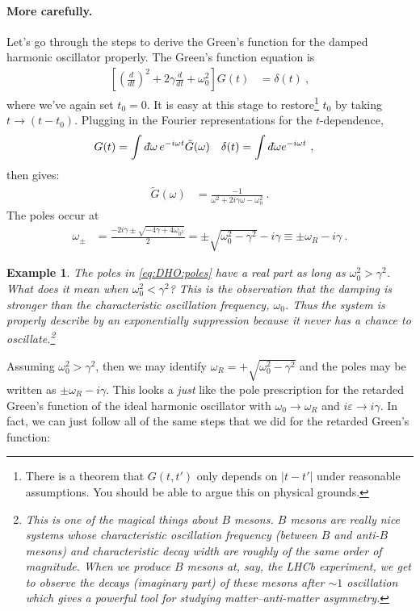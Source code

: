 \documentclass[
  11pt,
	colorful,
	raggedright,
]{tufte-style-thesis-flip}
\newtheorem{example}{Example}[section]
\renewcommand{\dbar}{d\hspace*{-0.08em}\bar{}\hspace*{0.1em}}
\begin{document}
 \paragraph{More carefully.} Let's go through the steps to derive the Green's function for the damped harmonic oscillator properly. The Green's function equation is
 \begin{align}
  \left[
  \left(\frac{d}{dt}\right)^2
  + 2\gamma \frac{d}{dt}
  + \omega_0^2
  \right]
  G(t)
  &=
  \delta(t) \ ,
 \end{align}
 where we've again set $t_0 = 0$. It is easy at this stage to restore\footnote{There is a theorem that $G(t,t')$ only depends on $|t-t'|$ under reasonable assumptions. You should be able to argue this on physical grounds.} $t_0$ by taking $t\to (t-t_0)$. Plugging in the Fourier representations for the $t$-dependence,
 \begin{align}
  G(t) &= \int \dbar \omega \, e^{-i\omega t}\tilde G(\omega)
  &
  \delta(t) &= \int \dbar \omega e^{-i\omega t} \ ,
 \end{align}
 then gives:
 \begin{align}
  \tilde G(\omega) &=
  \frac{-1}{\omega^2+2i\gamma\omega -\omega_0^2} \ .
 \end{align}
 The poles occur at 
 \begin{align}
  \omega_\pm &= \frac{-2i\gamma \pm \sqrt{-4\gamma + 4\omega_{0^2}}}{2}
  = \pm \sqrt{\omega_0^2 - \gamma^2} - i \gamma \equiv \pm \omega_R - i\gamma\ .
  \label{eq:DHO:poles}
 \end{align}
 \begin{example}
 The poles in \eqref{eq:DHO:poles} have a real part as long as $\omega_0^2 > \gamma^2$. What does it mean when $\omega_0^2 < \gamma^2$? This is the observation that the damping is stronger than the characteristic oscillation frequency, $\omega_0$. Thus the system is properly describe by an exponentially suppression because it never has a chance to oscillate.\footnote{This is one of the magical things about $B$ mesons. $B$ mesons are really nice systems whose characteristic oscillation frequency (between $B$ and anti-$B$ mesons) and characteristic decay width are roughly of the same order of magnitude. When we produce $B$ mesons at, say, the LHCb experiment, we get to observe the decays (imaginary part) of these mesons after $\sim 1$ oscillation which gives a powerful tool for studying matter--anti-matter asymmetry.\label{footnote:B:meson}}
 \end{example}
 Assuming $\omega_0^2 > \gamma^2$, then we may identify $\omega_R = +\sqrt{\omega_0^2 - \gamma^2}$ and the poles may be written as $\pm \omega_R - i\gamma$. This looks a \emph{just} like the pole prescription for the retarded Green's function of the ideal harmonic oscillator with $\omega_0\to \omega_R$ and $i\varepsilon\to i\gamma$. In fact, we can just follow all of the same steps that we did for the retarded Green's function:
\end{document}
